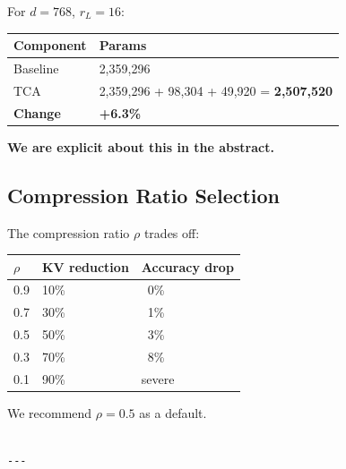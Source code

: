 For $d = 768$, $r_L = 16$:

\begin{table}[H]
\centering
\small
\begin{tabular}{ll}
\toprule
\textbf{Component} & \textbf{Params} \\
\midrule
Baseline & 2,359,296 \\
TCA & 2,359,296 + 98,304 + 49,920 = \textbf{2,507,520} \\
\textbf{Change} & \textbf{+6.3\%} \\
\bottomrule
\end{tabular}
\end{table}

\textbf{We are explicit about this in the abstract.}

\subsection{Compression Ratio Selection}

The compression ratio $\rho$ trades off:

\begin{table}[H]
\centering
\small
\begin{tabular}{lll}
\toprule
\textbf{$\rho$} & \textbf{KV reduction} & \textbf{Accuracy drop} \\
\midrule
0.9 & 10\% & ~0\% \\
0.7 & 30\% & ~1\% \\
0.5 & 50\% & ~3\% \\
0.3 & 70\% & ~8\% \\
0.1 & 90\% & severe \\
\bottomrule
\end{tabular}
\end{table}

We recommend $\rho = 0.5$ as a default.
\begin{lstlisting}

---
\end{lstlisting}